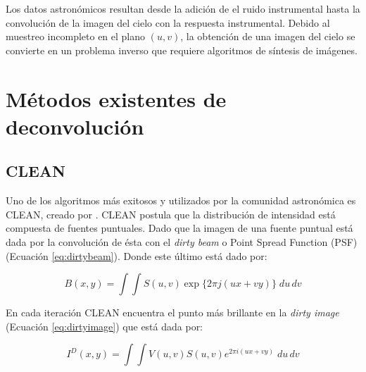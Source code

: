 

Los datos astronómicos resultan desde la adición de el ruido instrumental hasta la convolución de la imagen del cielo con la respuesta instrumental. Debido al muestreo incompleto en el plano $(u,v)$, la obtención de una imagen del cielo se convierte en un problema inverso que requiere algoritmos de síntesis de imágenes. 


\section{Métodos existentes de deconvolución} 

\subsection{CLEAN}

Uno de los algoritmos más exitosos y utilizados por la comunidad astronómica es CLEAN, creado por \citep{hogbom}. CLEAN postula que la distribución de intensidad está compuesta de fuentes puntuales. Dado que la imagen de una fuente puntual está dada por la convolución de ésta con el \textit{dirty beam} o Point Spread Function (PSF) (Ecuación \ref{eq:dirtybeam}). Donde este último está dado por:

\begin{equation}
B(x,y) = \int\int S(u,v) \exp\{2\pi j(ux+vy)\} \;du\,dv
\label{eq:dirtybeam}
\end{equation}

En cada iteración CLEAN encuentra el punto más brillante en la \textit{dirty image} (Ecuación \ref{eq:dirtyimage}) que está dada por:

\begin{equation}
I^{D}(x,y) = \int\int V(u,v)S(u,v)e^{2\pi i(ux+vy)}\;du\,dv
\label{eq:dirtyimage}
\end{equation}

